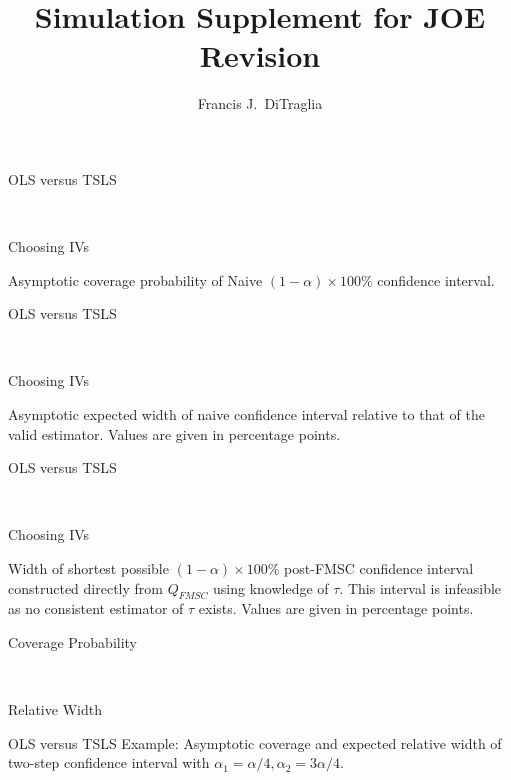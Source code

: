 \documentclass[12pt,letterpaper]{article}
\title{Simulation Supplement for JOE Revision}
\author{Francis J.\ DiTraglia}
\begin{document}
\maketitle


\begin{table}[h]
  \centering
  \begin{subtable}{0.48\textwidth}
    \caption{OLS versus TSLS}
    
  \end{subtable}
  ~
  \begin{subtable}{0.48\textwidth}
    \caption{Choosing IVs}
    
  \end{subtable}
  \caption{Asymptotic coverage probability of Naive $(1-\alpha)\times 100\%$ confidence interval.}
  \label{tab:LimitNaiveCover}
\end{table}

\begin{table}[h]
  \centering
  \begin{subtable}{0.48\textwidth}
    \caption{OLS versus TSLS}
    
  \end{subtable}
  ~
  \begin{subtable}{0.48\textwidth}
    \caption{Choosing IVs}
    
  \end{subtable}
  \caption{Asymptotic expected width of naive confidence interval relative to that of the valid estimator. Values are given in percentage points.}
  \label{tab:LimitNaiveWidth}
\end{table}

\begin{table}[h]
  \centering
  \begin{subtable}{0.48\textwidth}
    \caption{OLS versus TSLS}
    
  \end{subtable}
  ~
  \begin{subtable}{0.48\textwidth}
    \caption{Choosing IVs}
    
  \end{subtable}
  \caption{Width of shortest possible $(1-\alpha)\times 100\%$ post-FMSC confidence interval constructed directly from $Q_{FMSC}$ using knowledge of $\tau$. This interval is infeasible as no consistent estimator of $\tau$ exists. Values are given in percentage points.}
  \label{tab:WidthInfeasible}
\end{table}

\begin{table}[h]
  \centering
  \begin{subtable}{0.48\textwidth}
    \caption{Coverage Probability}
    
  \end{subtable}
  ~
  \begin{subtable}{0.48\textwidth}
    \caption{Relative Width}
    
  \end{subtable}
  \caption{OLS versus TSLS Example: Asymptotic coverage and expected relative width of two-step confidence interval with $\alpha_1 = \alpha/4,  \alpha_2 = 3\alpha/4$.}
  \label{tab:Limit2StepWideTauOLSvsIV}
\end{table}
\end{document}
